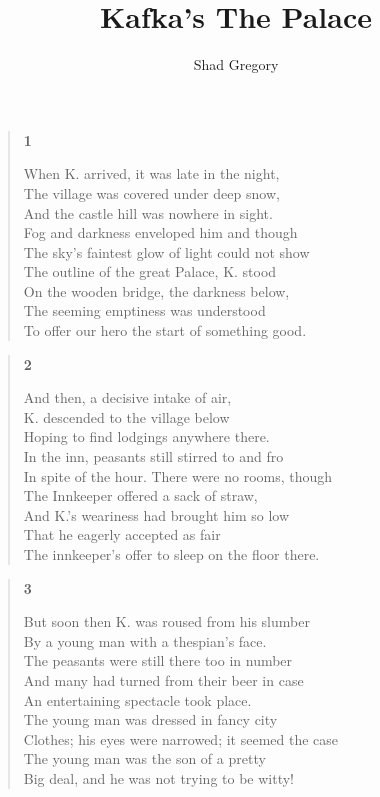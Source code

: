\documentclass{article}
\title{Kafka's The Palace}
\author{Shad Gregory}
\date{}
\begin{document}
\maketitle
\begin{verse}
  \begin{center}
    \textbf{1} \\
  \end{center}
  When K. arrived, it was late in the night, \\
  The village was covered under deep snow, \\
  And the castle hill was nowhere in sight. \\
  Fog and darkness enveloped him and though \\
  The sky's faintest glow of light could not show \\
  The outline of the great Palace, K. stood \\
  On the wooden bridge, the darkness below, \\
  The seeming emptiness was understood \\
  To offer our hero the start of something good.
\end{verse}
\begin{verse}
  \begin{center}
    \textbf{2} \\
  \end{center}
  And then, a decisive intake of air, \\
  K. descended to the village below \\
  Hoping to find lodgings anywhere there. \\
  In the inn, peasants still stirred to and fro \\
  In spite of the hour. There were no rooms, though \\
  The Innkeeper offered a sack of straw, \\
  And K.'s weariness had brought him so low \\
  That he eagerly accepted as fair \\
  The innkeeper's offer to sleep on the floor there. \\
\end{verse}
\begin{verse}
  \begin{center}
    \textbf{3} \\
  \end{center}
  But soon then K. was roused from his slumber \\
  By a young man with a thespian's face. \\
  The peasants were still there too in number \\
  And many had turned from their beer in case \\
  An entertaining spectacle took place. \\
  The young man was dressed in fancy city \\
  Clothes; his eyes were narrowed; it seemed the case \\
  The young man was the son of a pretty \\
  Big deal, and he was not trying to be witty!
\end{verse}
\end{document}
